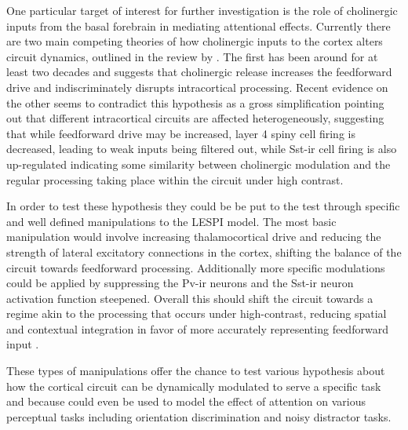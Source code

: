 One particular target of interest for further investigation is the
role of cholinergic inputs from the basal forebrain in mediating
attentional effects. Currently there are two main competing theories
of how cholinergic inputs to the cortex alters circuit dynamics,
outlined in the review by \cite{Thiele2013}. The first has been around
for at least two decades and suggests that cholinergic release
increases the feedforward drive and indiscriminately disrupts
intracortical processing. Recent evidence on the other seems to
contradict this hypothesis as a gross simplification pointing out that
different intracortical circuits are affected heterogeneously,
suggesting that while feedforward drive may be increased, layer 4
spiny cell firing is decreased, leading to weak inputs being filtered
out, while Sst-ir cell firing is also up-regulated indicating some
similarity between cholinergic modulation and the regular processing
taking place within the circuit under high contrast.

In order to test these hypothesis they could be be put to the test
through specific and well defined manipulations to the LESPI
model. The most basic manipulation would involve increasing
thalamocortical drive and reducing the strength of lateral excitatory
connections in the cortex, shifting the balance of the circuit towards
feedforward processing. Additionally more specific modulations could
be applied by suppressing the Pv-ir neurons and the Sst-ir neuron
activation function steepened. Overall this should shift the circuit
towards a regime akin to the processing that occurs under
high-contrast, reducing spatial and contextual integration in favor of
more accurately representing feedforward input \citep{Roberts2005,
  Roberts2008a, Roberts2008b}.

These types of manipulations offer the chance to test various
hypothesis about how the cortical circuit can be dynamically modulated
to serve a specific task and because could even be used to model the
effect of attention on various perceptual tasks including orientation
discrimination and noisy distractor tasks.
